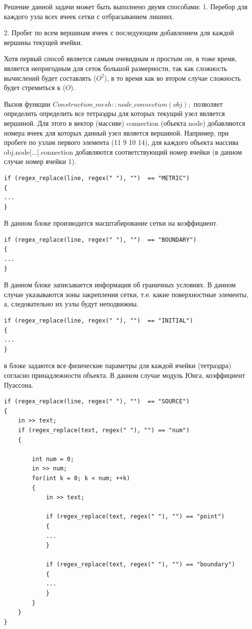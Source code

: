\documentclass[a4paper,12pt]{article}
\begin{document}
Решение данной задачи может быть выполнено двумя способами:
1. Перебор для каждого узла всех ячеек сетки с отбрасыванием лишних.

2. Пробег по всем вершинам ячеек с последующим добавлением для каждой вершины текущей ячейки.

Хотя первый способ является самым очевидным и простым он, в тоже время, является непригодным для сеток большой размерности, так как сложность вычислений будет составлять ($O^2$), в то время как во втором случае сложность будет стремиться к ($O$). 

Вызов функции $Construction\_mesh::node\_connection(obj);$ позволяет определить определить все тетраэдры для которых текущий узел является вершиной. Для этого в вектор (массиве) connection (объекта node) добавляются номера ячеек для которых данный узел является вершиной. Например, при пробеге по узлам первого элемента (11 9 10 14), для каждого объекта массива obj.node[...].connection добавляются соответствующий номер ячейки (в данном случае номер ячейки 1).

\begin{scriptsize}
\begin{verbatim}
if (regex_replace(line, regex(" "), "")  == "METRIC")
{
...
}	
\end{verbatim}
\end{scriptsize} 
В данном блоке производится масштабирование сетки на коэффициент.

\begin{scriptsize}
\begin{verbatim}
if (regex_replace(line, regex(" "), "")  == "BOUNDARY")
{ 
...
}
\end{verbatim}
\end{scriptsize} 
В данном блоке записывается информация об граничных условиях. В данном случае указываются зоны закрепления сетки, т.е. какие поверхностные элементы, а, следовательно их узлы будут неподвижны.

\begin{scriptsize}
\begin{verbatim}
if (regex_replace(line, regex(" "), "")  == "INITIAL")
{
...	
}
\end{verbatim}
\end{scriptsize} 
в блоке задаются все физические параметры для каждой ячейки (тетраэдра) согласно принадлежности объекта. В данном случае модуль Юнга, коэффициент Пуассона.

\begin{scriptsize}
\begin{verbatim}
if (regex_replace(line, regex(" "), "")  == "SOURCE")
{	
    in >> text;
    if (regex_replace(text, regex(" "), "") == "num")
    {	

        int num = 0;
        in >> num;
        for(int k = 0; k < num; ++k)
        {
            in >> text;		
			
            if (regex_replace(text, regex(" "), "") == "point")
            {
            ...
            }
			
            if (regex_replace(text, regex(" "), "") == "boundary")
            {
            ...
            }	
        }
    }
}
\end{verbatim}
\end{scriptsize} 
\end{document}
